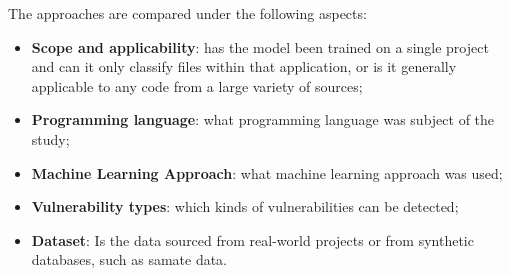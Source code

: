 The approaches are compared under the following aspects:
\begin{itemize}
\item \textbf{Scope and applicability}: has the model been trained on a single project and can it only classify files within that application, or is it generally applicable to any code from a large variety of sources;
\item \textbf{Programming language}: what programming language was subject of the study;
\item \textbf{Machine Learning Approach}: what machine learning approach was used;
\item \textbf{Vulnerability types}: which kinds of vulnerabilities can be detected;
\item \textbf{Dataset}: Is the data sourced from real-world projects or from synthetic databases, such as \gls{samate} data.
\end{itemize}


